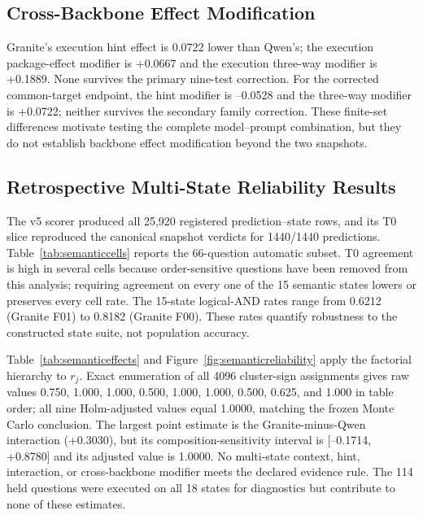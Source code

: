 \documentclass[applsci,article,submit,moreauthors]{Definitions/mdpi}
\begin{document}
\subsection{Cross-Backbone Effect Modification}
Granite's execution hint effect is 0.0722 lower than Qwen's; the execution package-effect modifier is +0.0667 and the execution three-way modifier is +0.1889. None survives the primary nine-test correction. For the corrected common-target endpoint, the hint modifier is --0.0528 and the three-way modifier is +0.0722; neither survives the secondary family correction. These finite-set differences motivate testing the complete model--prompt combination, but they do not establish backbone effect modification beyond the two snapshots.

\subsection{Retrospective Multi-State Reliability Results}
The v5 scorer produced all 25,920 registered prediction--state rows, and its T0 slice reproduced the canonical snapshot verdicts for 1440/1440 predictions. Table~\ref{tab:semanticcells} reports the 66-question automatic subset. T0 agreement is high in several cells because order-sensitive questions have been removed from this analysis; requiring agreement on every one of the 15 semantic states lowers or preserves every cell rate. The 15-state logical-AND rates range from 0.6212 (Granite F01) to 0.8182 (Granite F00). These rates quantify robustness to the constructed state suite, not population accuracy.

\begin{table}[H]
\caption{Snapshot and 15-state logical-AND execution agreement on the 66 order-insensitive questions. F00/F01 use full context without/with the hint; F10/F11 use compact context without/with the hint. The 114 order-sensitive questions are held from this automatic endpoint.}\label{tab:semanticcells}
\centering\resizebox{0.88\textwidth}{!}{}
\end{table}

Table~\ref{tab:semanticeffects} and Figure~\ref{fig:semanticreliability} apply the factorial hierarchy to $r_j$. Exact enumeration of all 4096 cluster-sign assignments gives raw values 0.750, 1.000, 1.000, 0.500, 1.000, 1.000, 0.500, 0.625, and 1.000 in table order; all nine Holm-adjusted values equal 1.0000, matching the frozen Monte Carlo conclusion. The largest point estimate is the Granite-minus-Qwen interaction (+0.3030), but its composition-sensitivity interval is [--0.1714, +0.8780] and its adjusted value is 1.0000. No multi-state context, hint, interaction, or cross-backbone modifier meets the declared evidence rule. The 114 held questions were executed on all 18 states for diagnostics but contribute to none of these estimates.
\end{document}
